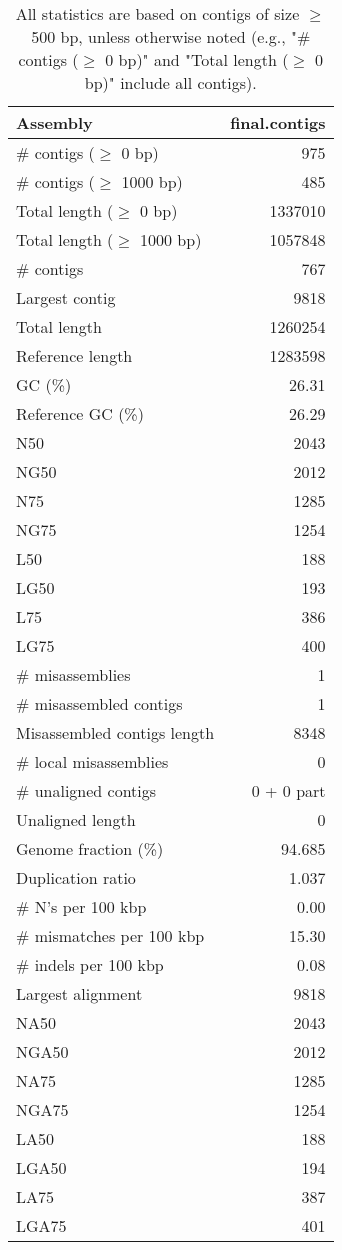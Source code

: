 \documentclass[12pt,a4paper]{article}
\begin{document}
\begin{table}[ht]
\begin{center}
\caption{All statistics are based on contigs of size $\geq$ 500 bp, unless otherwise noted (e.g., "\# contigs ($\geq$ 0 bp)" and "Total length ($\geq$ 0 bp)" include all contigs).}
\begin{tabular}{|l*{1}{|r}|}
\hline
Assembly & final.contigs \\ \hline
\# contigs ($\geq$ 0 bp) & 975 \\ \hline
\# contigs ($\geq$ 1000 bp) & 485 \\ \hline
Total length ($\geq$ 0 bp) & 1337010 \\ \hline
Total length ($\geq$ 1000 bp) & 1057848 \\ \hline
\# contigs & 767 \\ \hline
Largest contig & 9818 \\ \hline
Total length & 1260254 \\ \hline
Reference length & 1283598 \\ \hline
GC (\%) & 26.31 \\ \hline
Reference GC (\%) & 26.29 \\ \hline
N50 & 2043 \\ \hline
NG50 & 2012 \\ \hline
N75 & 1285 \\ \hline
NG75 & 1254 \\ \hline
L50 & 188 \\ \hline
LG50 & 193 \\ \hline
L75 & 386 \\ \hline
LG75 & 400 \\ \hline
\# misassemblies & 1 \\ \hline
\# misassembled contigs & 1 \\ \hline
Misassembled contigs length & 8348 \\ \hline
\# local misassemblies & 0 \\ \hline
\# unaligned contigs & 0 + 0 part \\ \hline
Unaligned length & 0 \\ \hline
Genome fraction (\%) & 94.685 \\ \hline
Duplication ratio & 1.037 \\ \hline
\# N's per 100 kbp & 0.00 \\ \hline
\# mismatches per 100 kbp & 15.30 \\ \hline
\# indels per 100 kbp & 0.08 \\ \hline
Largest alignment & 9818 \\ \hline
NA50 & 2043 \\ \hline
NGA50 & 2012 \\ \hline
NA75 & 1285 \\ \hline
NGA75 & 1254 \\ \hline
LA50 & 188 \\ \hline
LGA50 & 194 \\ \hline
LA75 & 387 \\ \hline
LGA75 & 401 \\ \hline
\end{tabular}
\end{center}
\end{table}
\end{document}
